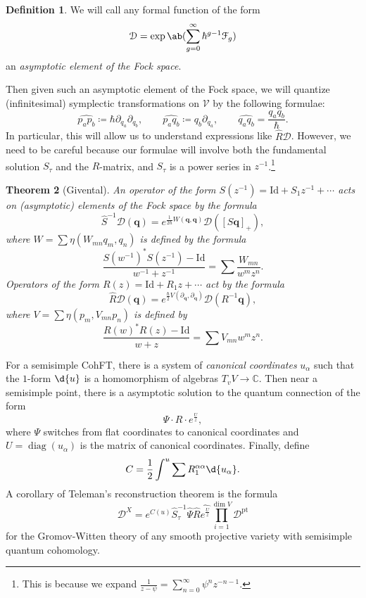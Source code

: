 \documentclass[10pt]{amsart}
\newtheorem{thm}{Theorem}[section]
\theoremstyle{definition}
\newtheorem{defn}[thm]{Definition}
\theoremstyle{remark}
\theoremstyle{plain}
\theoremstyle{definition}
\theoremstyle{remark}
\newcommand{\C}{\mathbb{C}}
\newcommand{\mc}[1]{\mathcal{#1}}
\newcommand{\mbf}[1]{\mathbf{#1}}
\newcommand{\bq}{\mbf{q}}
\newcommand{\mr}[1]{\mathrm{#1}}
\newcommand{\on}[1]{\operatorname{#1}}
\newcommand{\wh}[1]{\widehat{#1}}
\newcommand{\1}{\mathbf{1}}
\newcommand{\2}{\mathbf{2}}
\newcommand{\3}{\mathbf{3}}
\begin{document}
\begin{defn}
    We will call any formal function of the form
    \[ \mc{D} = \exp\ab(\sum_{g=0}^{\infty} \hbar^{g-1} \mc{F}_g) \]
    an \textit{asymptotic element of the Fock space}.
\end{defn}

Then given such an asymptotic element of the Fock space, we will quantize (infinitesimal) symplectic transformations on $\mc{V}$ by the following formulae:
\[ \wh{p_a p_b} \coloneqq \hbar \partial_{q_a} \partial_{q_b}, \qquad \wh{p_a q_b} \coloneqq q_b \partial_{q_a}, \qquad \wh{q_a q_b} = \frac{q_a q_b}{\hbar}. \]
In particular, this will allow us to understand expressions like $\hat{R} \mc{D}$. However, we need to be careful because our formulae will involve both the fundamental solution $S_{\tau}$ and the $R$-matrix, and $S_{\tau}$ is a power series in $z^{-1}$.\footnote{This is because we expand $\frac{1}{z-\psi} = \sum_{n=0}^{\infty} \psi^n z^{-n-1}$.}

\begin{thm}[Givental]
    An operator of the form $S(z^{-1}) = \mr{Id} + S_1 z^{-1} + \cdots$ acts on (asymptotic) elements of the Fock space by the formula
    \[ \hat{S}^{-1} \mc{D}(\bq) = e^{\frac{1}{2\hbar}W(\bq,\bq)} \mc{D}([S \bq]_+), \]
    where $W = \sum \eta(W_{mn}q_m, q_n)$ is defined by the formula
    \[ \frac{S(w^{-1})^* S(z^{-1}) - \mr{Id}}{w^{-1}+z^{-1}} = \sum \frac{W_{mn}}{w^m z^n}. \]
    Operators of the form $R(z) = \mr{Id} + R_1 z + \cdots$ act by the formula
    \[ \hat{R}\mc{D}(\bq) = e^{\frac{\hbar}{2} V(\partial_{\bq}, \partial_{\bq})} \mc{D}(R^{-1} \bq), \]
    where $V = \sum \eta(p_m, V_{mn} p_n)$ is defined by 
    \[ \frac{R(w)^* R(z) - \mr{Id}}{w+z} = \sum V_{mn} w^m z^n. \]
\end{thm}

For a semisimple CohFT, there is a system of \textit{canonical coordinates} $u_{\alpha}$ such that the $1$-form $\d{u}$ is a homomorphism of algebras $T_v V \to \C$. Then near a semisimple point, there is a asymptotic solution to the quantum connection of the form
\[ \Psi \cdot  R \cdot e^{\frac{U}{z}}, \]
where $\Psi$ switches from flat coordinates to canonical coordinates and $U = \on{diag}(u_{\alpha})$ is the matrix of canonical coordinates. Finally, define
\[ C = \frac{1}{2} \int^u \sum R_1^{\alpha\alpha} \d{u_{\alpha}}. \]
A corollary of Teleman's reconstruction theorem is the formula
\[ \mc{D}^X = e^{C(u)} \hat{S}^{-1}_{\tau} \hat{\Psi} \hat{R} \wh{e^{\frac{U}{z}}} \prod_{i=1}^{\dim V} \mc{D}^{\mr{pt}} \]
for the Gromov-Witten theory of any smooth projective variety with semisimple quantum cohomology.
\end{document}
